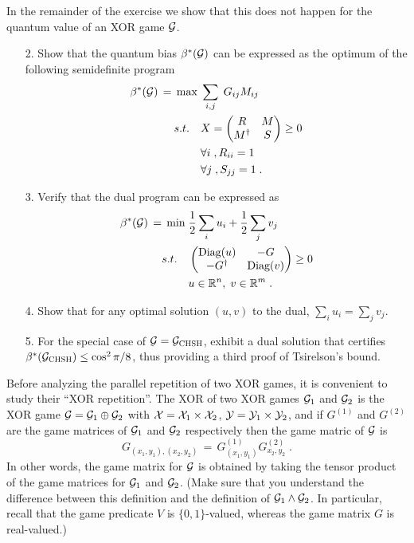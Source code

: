 \begin{exercise}
In the remainder of the exercise we show that this does not happen for the quantum value of an XOR game $\mathcal{G}$. 
\begin{enumerate}
\item[2.] Show that the quantum bias $\beta^*(\mathcal{G})$ can be expressed as the optimum of the following semidefinite program
\begin{align*}
 \beta^*(\mathcal{G}) \,=\, \max \;&  \sum_{i,j}\; G_{ij} M_{ij} \\
s.t. \quad &  X = \begin{pmatrix} R & M \\ M^\dagger & S \end{pmatrix} \geq 0 \\
& \forall i\;, R_{ii}=1\\
& \forall j\;, S_{jj}=1\;.
\end{align*}
\item[3.] Verify that the dual program can be expressed as 
\begin{align}
 \beta^*(\mathcal{G}) \,=\, \min\; &  \frac{1}{2}\sum_{i} u_i + \frac{1}{2} \sum_j v_j\label{eq:dual-xor}\\
s.t. \quad&  \begin{pmatrix} \text{Diag}(u) & -G \\ -G^\dagger & \text{Diag}(v) \end{pmatrix} \geq 0 \notag\\
& u\in \mathbb{R}^n,\; v\in \mathbb{R}^m\;.\notag
\end{align}
\item[4.] Show that for any optimal solution $(u,v)$ to the dual, $\sum_i u_i = \sum_j v_j$. 
\item[5.] For the special case of $\mathcal{G} = \mathcal{G}_{\textsc{CHSH}}$, exhibit a dual solution that certifies $\beta^*(\mathcal{G}_{\textsc{CHSH}})\leq \cos^2\pi/8$, thus providing a third proof of Tsirelson's bound. 
\end{enumerate}
Before analyzing the parallel repetition of two XOR games, it is convenient to study their ``XOR repetition''. The XOR of two XOR games $\mathcal{G}_1$ and $\mathcal{G}_2$ is the XOR game $\mathcal{G} = \mathcal{G}_1\oplus \mathcal{G}_2$ with $\mathcal{X}=\mathcal{X}_1\times \mathcal{X}_2$, $\mathcal{Y}=\mathcal{Y}_1\times \mathcal{Y}_2$, and if $G^{(1)}$ and $G^{(2)}$ are the game matrices of $\mathcal{G}_1$ and $\mathcal{G}_2$ respectively then the game matric of $\mathcal{G}$ is  
\[ G_{(x_1,y_1),(x_2,y_2)} \,=\, G^{(1)}_{(x_1,y_1)} G^{(2)}_{x_2,y_2}\;.\]
In other words, the game matrix for $\mathcal{G}$ is obtained by taking the tensor product of the game matrices for $\mathcal{G}_1$ and $\mathcal{G}_2$. (Make sure that you understand the difference between this definition and the definition of $\mathcal{G}_1\wedge \mathcal{G}_2$. In particular, recall that the game predicate $V$ is $\{0,1\}$-valued, whereas the game matrix $G$ is real-valued.)

\end{exercise}
